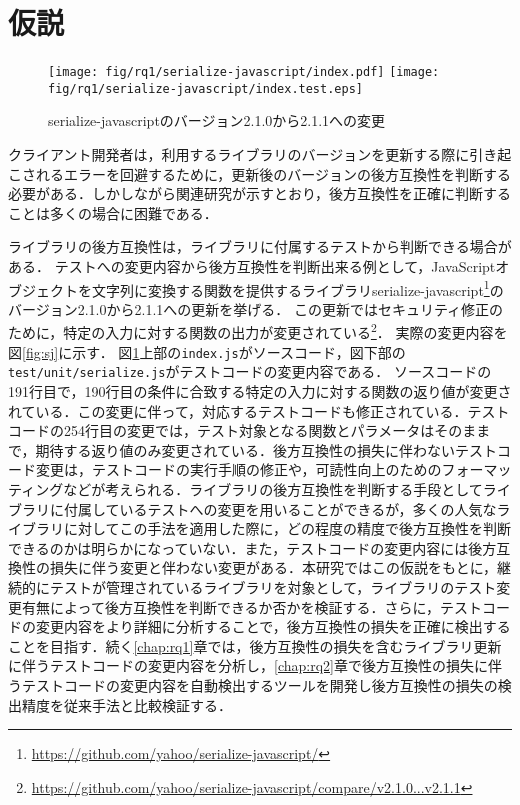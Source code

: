 \documentclass[submit]{ipsj}
\begin{document}
\section{仮説}
\label{sec:hypothesis}

\begin{figure}[t]
  \centering
  \texttt{[image: fig/rq1/serialize-javascript/index.pdf]}
  \texttt{[image: fig/rq1/serialize-javascript/index.test.eps]}
  \caption{serialize-javascriptのバージョン2.1.0から2.1.1への変更}
  \label{fig:motivation}
\end{figure}


クライアント開発者は，利用するライブラリのバージョンを更新する際に引き起こされるエラーを回避するために，更新後のバージョンの後方互換性を判断する必要がある．しかしながら関連研究が示すとおり，後方互換性を正確に判断することは多くの場合に困難である．

ライブラリの後方互換性は，ライブラリに付属するテストから判断できる場合がある．
テストへの変更内容から後方互換性を判断出来る例として，JavaScriptオブジェクトを文字列に変換する関数を提供するライブラリserialize-javascript\footnote{\url{https://github.com/yahoo/serialize-javascript/}}のバージョン2.1.0から2.1.1への更新を挙げる．
この更新ではセキュリティ修正のために，特定の入力に対する関数の出力が変更されている\footnote{\url{https://github.com/yahoo/serialize-javascript/compare/v2.1.0...v2.1.1}}．
実際の変更内容を図\ref{fig:sj}に示す．
図\ref{fig:motivation}上部の{\verb|index.js|}がソースコード，図下部の{\verb|test/unit/serialize.js|}がテストコードの変更内容である．
ソースコードの191行目で，190行目の条件に合致する特定の入力に対する関数の返り値が変更されている．この変更に伴って，対応するテストコードも修正されている．テストコードの254行目の変更では，テスト対象となる関数とパラメータはそのままで，期待する返り値のみ変更されている．後方互換性の損失に伴わないテストコード変更は，テストコードの実行手順の修正や，可読性向上のためのフォーマッティングなどが考えられる．ライブラリの後方互換性を判断する手段としてライブラリに付属しているテストへの変更を用いることができるが，多くの人気なライブラリに対してこの手法を適用した際に，どの程度の精度で後方互換性を判断できるのかは明らかになっていない．また，テストコードの変更内容には後方互換性の損失に伴う変更と伴わない変更がある．本研究ではこの仮説をもとに，継続的にテストが管理されているライブラリを対象として，ライブラリのテスト変更有無によって後方互換性を判断できるか否かを検証する．さらに，テストコードの変更内容をより詳細に分析することで，後方互換性の損失を正確に検出することを目指す．続く\ref{chap:rq1}章では，後方互換性の損失を含むライブラリ更新に伴うテストコードの変更内容を分析し，\ref{chap:rq2}章で後方互換性の損失に伴うテストコードの変更内容を自動検出するツールを開発し後方互換性の損失の検出精度を従来手法と比較検証する．
\end{document}
